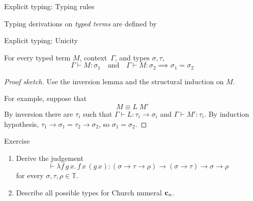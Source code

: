 \begin{frame}{Explicit typing: Typing rules}
\begin{definition}
  Typing derivations on \emph{typed terms} are defined by 
  \begin{prooftree}
  \end{prooftree}
  \begin{prooftree}
  \end{prooftree}
  \begin{prooftree}
  \end{prooftree}
\end{definition}

\end{frame}
\begin{frame}{Explicit typing: Unicity}
\begin{proposition}
  For every typed term $M$, context~$\Gamma$, and types $\sigma, \tau$, 
  \[
    \Gamma \vdash M : \sigma_1
    \quad\text{and}\quad
    \Gamma \vdash M : \sigma_2
    \implies
    \sigma_1 = \sigma_2
  \]
\end{proposition}
\begin{proof}[Proof sketch]
  Use the inversion lemma and the structural induction on $M$.

  For example, suppose that 
  \[
    M \equiv L\;M'
  \]
  By inversion there are $\tau_i$ such that $\Gamma \vdash L: \tau_i \to
  \sigma_i$ and $\Gamma \vdash M': \tau_i$. By induction hypothesis, $\tau_1 \to
  \sigma_1 = \tau_2 \to \sigma_2$, so $\sigma_1 = \sigma_2$.
\end{proof}
\end{frame}

\begin{frame}{Exercise}
  \begin{enumerate}
    \item Derive the judgement
      \[
        \vdash \lambda f\,g\,x.\, f\,x\, (g\,x) : (\sigma \to \tau \to \rho) \to
        (\sigma\to\tau) \to \sigma\to\rho 
      \]
      for every $\sigma, \tau, \rho \in \mathbb{T}$.

    \item Describe all possible types for Church numeral $\bc_{n}$.

    
  \end{enumerate}

\end{frame}


